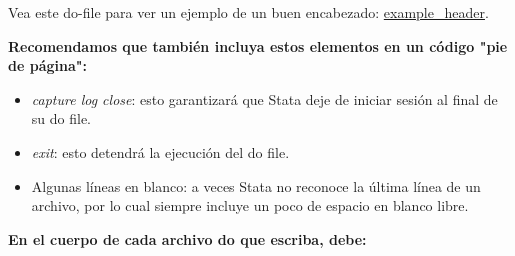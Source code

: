 \documentclass[11pt,en]{elegantpaper}
\begin{document}
Vea este do-file para ver un ejemplo de un buen encabezado: \href{http://www.poverty-action.org/research-transparency/example-header}{example\_header}.

\noindent
\textbf{Recomendamos que también incluya estos elementos en un código "pie de página":}

\begin{itemize}
	\item \textit{capture log close}: esto garantizará que Stata deje de iniciar sesión al final de su do file.
	\item \textit{exit}: esto detendrá la ejecución del do file.
	\item Algunas líneas en blanco: a veces Stata no reconoce la última línea de un archivo, por lo cual siempre incluye un poco de espacio en blanco libre.
\end{itemize}

\noindent
\textbf{En el cuerpo de cada archivo do que escriba, debe:}
\end{document}
